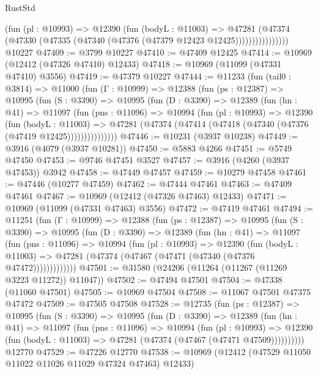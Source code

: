 \begin{lexlean}{RustStd}
\begin{coremodule}
                    (fun (pl : @10993) =>
                    @12390
                      (fun (bodyL : @11003) =>
                      @47281
                        (@47374
                          (@47330 (@47335 (@47340 (@47376 (@47379 @12423 @12425))))))))))))))))
    @10227
@47409 := @3799 @10227
@47410 := @47409 @12425
@47414 := @10969 (@12412 (@47326 @47410) @12433)
@47418 := @10969 (@11099 (@47331 @47410) @3556)
@47419 := @47379 @10227
@47444 := @11233
    (fun (tail0 : @3814) =>
    @11000
      (fun (Γ : @10999) =>
      @12388
        (fun (ps : @12387) =>
        @10995
          (fun (S : @3390) =>
          @10995
            (fun (D : @3390) =>
            @12389
              (fun (hn : @41) =>
              @11097
                (fun (pns : @11096) =>
                @10994
                  (fun (pl : @10993) =>
                  @12390
                    (fun (bodyL : @11003) =>
                    @47281 (@47374 (@47414 (@47418 (@47340 (@47376 (@47419 @12425)))))))))))))))
@47446 := @10231 (@3937 @10238)
@47449 := @3916 (@4079 (@3937 @10281))
@47450 := @5883 @4266
@47451 := @5749 @47450
@47453 := @9746 @47451 @3527
@47457 := @3916 (@4260 (@3937 @47453)) @3942
@47458 := @47449 @47457
@47459 := @10279 @47458
@47461 := @47446 (@10277 @47459)
@47462 := @47444 @47461
@47463 := @47409 @47461
@47467 := @10969 (@12412 (@47326 @47463) @12433)
@47471 := @10969 (@11099 (@47331 @47463) @3556)
@47472 := @47419 @47461
@47494 := @11251
    (fun (Γ : @10999) =>
    @12388
      (fun (ps : @12387) =>
      @10995
        (fun (S : @3390) =>
        @10995
          (fun (D : @3390) =>
          @12389
            (fun (hn : @41) =>
            @11097
              (fun (pns : @11096) =>
              @10994
                (fun (pl : @10993) =>
                @12390
                  (fun (bodyL : @11003) =>
                  @47281 (@47374 (@47467 (@47471 (@47340 (@47376 @47472)))))))))))))
@47501 := @31580 (@24206 (@11264 (@11267 (@11269 @3223 @11272)) @11047))
@47502 := @47494 @47501
@47504 := @47338 (@11060 @47501)
@47505 := @10969 @47504
@47508 := @11067 @47501 @47375 @47472
@47509 := @47505 @47508
@47528 := @12735
    (fun (ps : @12387) =>
    @10995
      (fun (S : @3390) =>
      @10995
        (fun (D : @3390) =>
        @12389
          (fun (hn : @41) =>
          @11097
            (fun (pns : @11096) =>
            @10994
              (fun (pl : @10993) =>
              @12390 (fun (bodyL : @11003) => @47281 (@47374 (@47467 (@47471 @47509))))))))))
    @12770
@47529 := @47226 @12770
@47538 := @10969 (@12412 (@47529 @11050 @11022 @11026 @11029 @47324 @47463) @12433)

\end{coremodule}
\end{lexlean}
